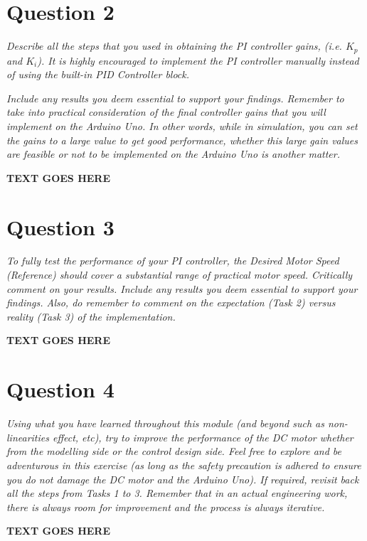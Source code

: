 \documentclass[11pt, onecolumn]{article}
\begin{document}
\section*{Question 2}
\par \textit{Describe all the steps that you used in obtaining the PI controller gains, (i.e. $K_p$ and $K_i$). It is highly encouraged to implement the PI controller manually instead of using the built-in PID Controller block.}
\par \textit{Include any results you deem essential to support your findings. Remember to take into practical consideration of the final controller gains that you will implement on the Arduino Uno. In other words, while in simulation, you can set the gains to a large value to get good performance, whether this large gain values are feasible or not to be implemented on the Arduino Uno is another matter.}
\noindent\makebox[\linewidth]{\rule{\textwidth}{0.4pt}}
\par \textbf{TEXT GOES HERE}
\section*{Question 3}
\par \textit{To fully test the performance of your PI controller, the Desired Motor Speed (Reference) should cover a substantial range of practical motor speed. Critically comment on your results. Include any results you deem essential to support your findings. Also, do remember to comment on the expectation (Task 2) versus reality (Task 3) of the implementation.}
\noindent\makebox[\linewidth]{\rule{\textwidth}{0.4pt}}
\par \textbf{TEXT GOES HERE}
\section*{Question 4}
\par \textit{Using what you have learned throughout this module (and beyond such as non- linearities effect, etc), try to improve the performance of the DC motor whether from the modelling side or the control design side. Feel free to explore and be adventurous in this exercise (as long as the safety precaution is adhered to ensure you do not damage the DC motor and the Arduino Uno). If required, revisit back all the steps from Tasks 1 to 3. Remember that in an actual engineering work, there is always room for improvement and the process is always iterative.}
\noindent\makebox[\linewidth]{\rule{\textwidth}{0.4pt}}
\par \textbf{TEXT GOES HERE}
\end{document}
